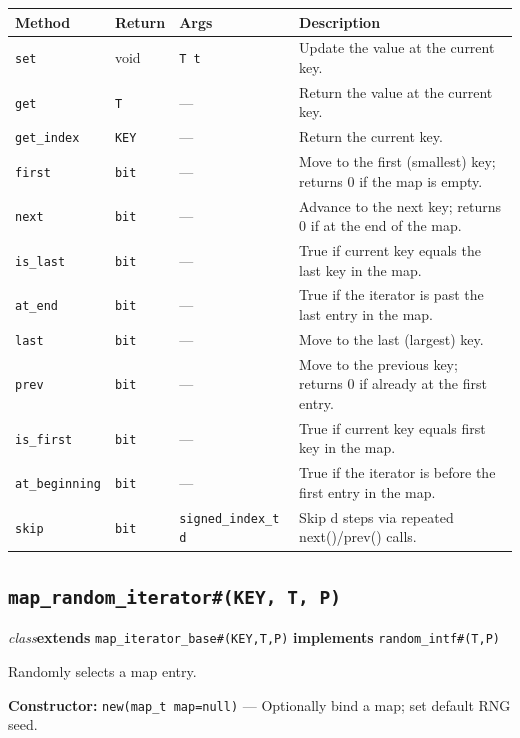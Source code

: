 \documentclass[11pt,letterpaper]{report}
\begin{document}
\begin{xltabular}{\linewidth}{>{\small}p{1.35in} >{\small}p{1.25in} >{\small}p{0.95in} >{\small}X}
\toprule
\textbf{Method} & \textbf{Return} & \textbf{Args} & \textbf{Description} \\
\midrule
\endhead
\bottomrule
\endfoot
\texttt{set} & void & \texttt{T t} & Update the value at the current key. \\
\texttt{get} & \texttt{T} & --- & Return the value at the current key. \\
\texttt{get\_index} & \texttt{KEY} & --- & Return the current key. \\
\texttt{first} & \texttt{bit} & --- & Move to the first (smallest) key; returns 0 if the map is empty. \\
\texttt{next} & \texttt{bit} & --- & Advance to the next key; returns 0 if at the end of the map. \\
\texttt{is\_last} & \texttt{bit} & --- & True if current key equals the last key in the map. \\
\texttt{at\_end} & \texttt{bit} & --- & True if the iterator is past the last entry in the map. \\
\texttt{last} & \texttt{bit} & --- & Move to the last (largest) key. \\
\texttt{prev} & \texttt{bit} & --- & Move to the previous key; returns 0 if already at the first entry. \\
\texttt{is\_first} & \texttt{bit} & --- & True if current key equals first key in the map. \\
\texttt{at\_beginning} & \texttt{bit} & --- & True if the iterator is before the first entry in the map. \\
\texttt{skip} & \texttt{bit} & \texttt{signed\_index\_t d} & Skip d steps via repeated next()/prev() calls. \\
\end{xltabular}

\subsection*{\texttt{map\_random\_iterator\#(KEY, T, P)}}
\noindent\small\textit{class}\quad \textbf{extends} \texttt{map\_iterator\_base\#(KEY,T,P)} \quad \textbf{implements} \texttt{random\_intf\#(T,P)}\par

Randomly selects a map entry.

\noindent\textbf{Constructor:} \texttt{new(map\_t map=null)} --- Optionally bind a map; set default RNG seed.
\end{document}
